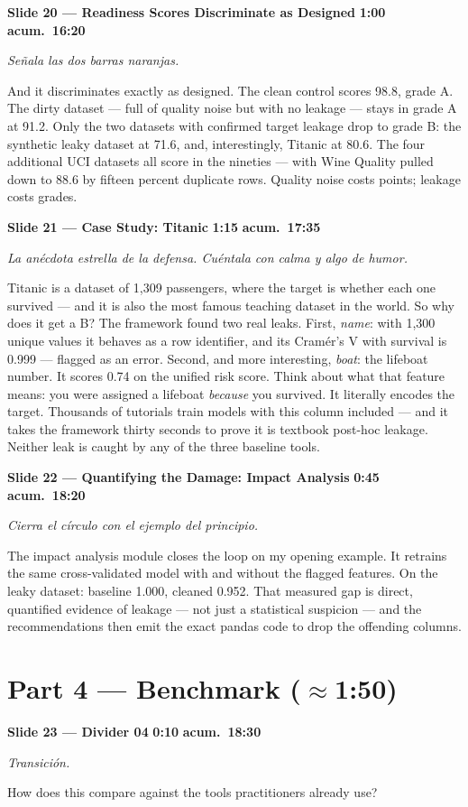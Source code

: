\documentclass[11pt,a4paper]{article}
\newcommand{\slide}[6]{%
\begin{mdframed}[backgroundcolor=paleBlue, linecolor=upmBlue, linewidth=1pt,
                 roundcorner=4pt, skipabove=10pt, skipbelow=2pt,
                 innertopmargin=6pt, innerbottommargin=6pt]
\textbf{\color{upmBlue}Slide #1 --- #2}\hfill
\colorbox{upmOrange}{\color{white}\small\textbf{ #3 }}\;%
\colorbox{upmBlue}{\color{white}\small\textbf{ acum.\ #4 }}
\end{mdframed}
{\small\itshape\color{grayTxt}#5}\par\vspace{2pt}
#6\par\vspace{6pt}}
\begin{document}
\slide{20}{Readiness Scores Discriminate as Designed}{1:00}{16:20}
{Señala las dos barras naranjas.}
{And it discriminates exactly as designed. The clean control scores 98.8,
grade A. The dirty dataset --- full of quality noise but with no leakage ---
stays in grade A at 91.2. Only the two datasets with confirmed target leakage
drop to grade B: the synthetic leaky dataset at 71.6, and, interestingly,
Titanic at 80.6. The four additional UCI datasets all score in the nineties
--- with Wine Quality pulled down to 88.6 by fifteen percent duplicate rows.
Quality noise costs points; leakage costs grades.}

\slide{21}{Case Study: Titanic}{1:15}{17:35}
{La anécdota estrella de la defensa. Cuéntala con calma y algo de humor.}
{Titanic is a dataset of 1,309 passengers, where the target is whether each
one survived --- and it is also the most famous teaching dataset in the
world. So why does it get a B? The framework found two real leaks. First, \emph{name}: with 1,300 unique
values it behaves as a row identifier, and its Cramér's V with survival is
0.999 --- flagged as an error. Second, and more interesting, \emph{boat}: the
lifeboat number. It scores 0.74 on the unified risk score. Think about what
that feature means: you were assigned a lifeboat \emph{because} you survived.
It literally encodes the target. Thousands of tutorials train models with
this column included --- and it takes the framework thirty seconds to prove
it is textbook post-hoc leakage. Neither leak is caught by any of the three
baseline tools.}

\slide{22}{Quantifying the Damage: Impact Analysis}{0:45}{18:20}
{Cierra el círculo con el ejemplo del principio.}
{The impact analysis module closes the loop on my opening example. It retrains
the same cross-validated model with and without the flagged features. On the
leaky dataset: baseline 1.000, cleaned 0.952. That measured gap is direct,
quantified evidence of leakage --- not just a statistical suspicion --- and
the recommendations then emit the exact pandas code to drop the offending
columns.}

\section*{\color{upmBlue}Part 4 --- Benchmark (\normalfont$\approx$1:50)}

\slide{23}{Divider 04}{0:10}{18:30}
{Transición.}
{How does this compare against the tools practitioners already use?}
\end{document}
